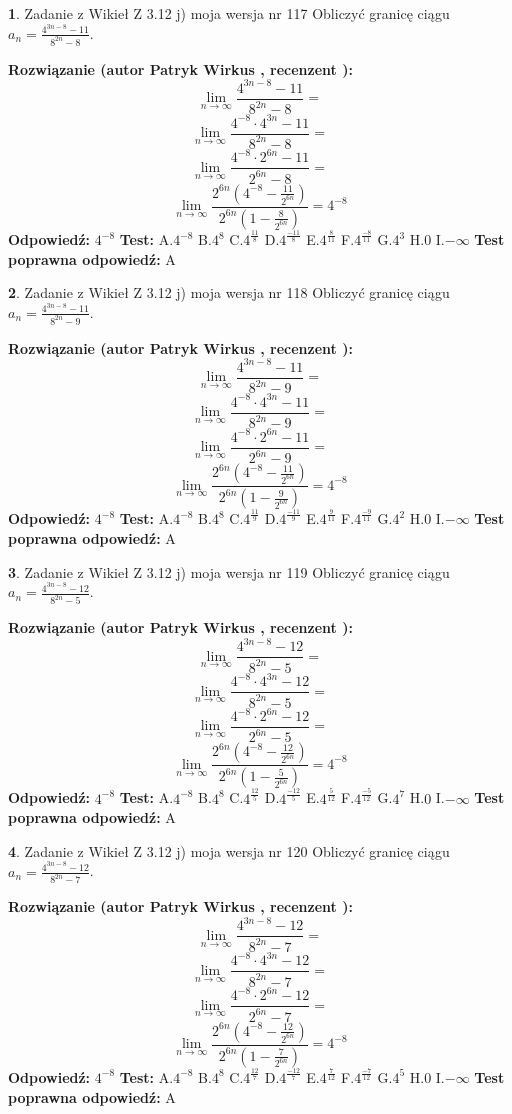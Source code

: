 \documentclass[12pt, a4paper]{article}
\theoremstyle{definition} %
\newtheorem{zad}{}
\newcommand{\zadStart}[1]{\begin{zad}#1\newline}
\newcommand{\zadStop}{\end{zad}}
\newcommand{\rozwStart}[2]{\noindent \textbf{Rozwiązanie (autor #1 , recenzent #2): }\newline}
\newcommand{\rozwStop}{\newline}
\newcommand{\odpStart}{\noindent \textbf{Odpowiedź:}\newline}
\newcommand{\odpStop}{\newline}
\newcommand{\testStart}{\noindent \textbf{Test:}\newline}
\newcommand{\testStop}{\newline}
\newcommand{\kluczStart}{\noindent \textbf{Test poprawna odpowiedź:}\newline}
\newcommand{\kluczStop}{\newline}
\begin{document}
\zadStart{Zadanie z Wikieł Z 3.12 j) moja wersja nr 117}
Obliczyć granicę ciągu $a_{n}=\frac{4^{3n-8}-11}{8^{2n}-8}$.
\zadStop
\rozwStart{Patryk Wirkus}{}
$$\lim\limits_{n\to\infty}\frac{4^{3n-8}-11}{8^{2n}-8}=$$
$$\lim\limits_{n\to\infty}\frac{4^{-8} \cdot 4^{3n}-11}{8^{2n}-8}=$$
$$\lim\limits_{n\to\infty}\frac{4^{-8} \cdot 2^{6n}-11}{2^{6n}-8}=$$
$$\lim\limits_{n\to\infty}\frac{2^{6n}(4^{-8} - \frac{11}{2^{6n}})}{2^{6n}(1-\frac{8}{2^{6n}})}= 4^{-8}$$
\rozwStop
\odpStart
$4^{-8}$
\odpStop
\testStart
A.$4^{-8}$
B.$4^{8}$
C.$4^{\frac{11}{8}}$
D.$4^{\frac{-11}{8}}$
E.$4^{\frac{8}{11}}$
F.$4^{\frac{-8}{11}}$
G.$4^{3}$
H.$0$
I.$-\infty$
\testStop
\kluczStart
A
\kluczStop



\zadStart{Zadanie z Wikieł Z 3.12 j) moja wersja nr 118}
Obliczyć granicę ciągu $a_{n}=\frac{4^{3n-8}-11}{8^{2n}-9}$.
\zadStop
\rozwStart{Patryk Wirkus}{}
$$\lim\limits_{n\to\infty}\frac{4^{3n-8}-11}{8^{2n}-9}=$$
$$\lim\limits_{n\to\infty}\frac{4^{-8} \cdot 4^{3n}-11}{8^{2n}-9}=$$
$$\lim\limits_{n\to\infty}\frac{4^{-8} \cdot 2^{6n}-11}{2^{6n}-9}=$$
$$\lim\limits_{n\to\infty}\frac{2^{6n}(4^{-8} - \frac{11}{2^{6n}})}{2^{6n}(1-\frac{9}{2^{6n}})}= 4^{-8}$$
\rozwStop
\odpStart
$4^{-8}$
\odpStop
\testStart
A.$4^{-8}$
B.$4^{8}$
C.$4^{\frac{11}{9}}$
D.$4^{\frac{-11}{9}}$
E.$4^{\frac{9}{11}}$
F.$4^{\frac{-9}{11}}$
G.$4^{2}$
H.$0$
I.$-\infty$
\testStop
\kluczStart
A
\kluczStop



\zadStart{Zadanie z Wikieł Z 3.12 j) moja wersja nr 119}
Obliczyć granicę ciągu $a_{n}=\frac{4^{3n-8}-12}{8^{2n}-5}$.
\zadStop
\rozwStart{Patryk Wirkus}{}
$$\lim\limits_{n\to\infty}\frac{4^{3n-8}-12}{8^{2n}-5}=$$
$$\lim\limits_{n\to\infty}\frac{4^{-8} \cdot 4^{3n}-12}{8^{2n}-5}=$$
$$\lim\limits_{n\to\infty}\frac{4^{-8} \cdot 2^{6n}-12}{2^{6n}-5}=$$
$$\lim\limits_{n\to\infty}\frac{2^{6n}(4^{-8} - \frac{12}{2^{6n}})}{2^{6n}(1-\frac{5}{2^{6n}})}= 4^{-8}$$
\rozwStop
\odpStart
$4^{-8}$
\odpStop
\testStart
A.$4^{-8}$
B.$4^{8}$
C.$4^{\frac{12}{5}}$
D.$4^{\frac{-12}{5}}$
E.$4^{\frac{5}{12}}$
F.$4^{\frac{-5}{12}}$
G.$4^{7}$
H.$0$
I.$-\infty$
\testStop
\kluczStart
A
\kluczStop



\zadStart{Zadanie z Wikieł Z 3.12 j) moja wersja nr 120}
Obliczyć granicę ciągu $a_{n}=\frac{4^{3n-8}-12}{8^{2n}-7}$.
\zadStop
\rozwStart{Patryk Wirkus}{}
$$\lim\limits_{n\to\infty}\frac{4^{3n-8}-12}{8^{2n}-7}=$$
$$\lim\limits_{n\to\infty}\frac{4^{-8} \cdot 4^{3n}-12}{8^{2n}-7}=$$
$$\lim\limits_{n\to\infty}\frac{4^{-8} \cdot 2^{6n}-12}{2^{6n}-7}=$$
$$\lim\limits_{n\to\infty}\frac{2^{6n}(4^{-8} - \frac{12}{2^{6n}})}{2^{6n}(1-\frac{7}{2^{6n}})}= 4^{-8}$$
\rozwStop
\odpStart
$4^{-8}$
\odpStop
\testStart
A.$4^{-8}$
B.$4^{8}$
C.$4^{\frac{12}{7}}$
D.$4^{\frac{-12}{7}}$
E.$4^{\frac{7}{12}}$
F.$4^{\frac{-7}{12}}$
G.$4^{5}$
H.$0$
I.$-\infty$
\testStop
\kluczStart
A
\kluczStop
\end{document}
